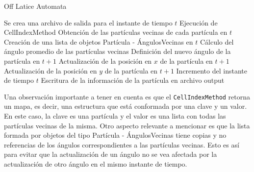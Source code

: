 \documentclass[11pt]{article}
\begin{document}
            \begin{algorithm}
                \caption{Off Latice Automata}
                \begin{algorithmic}[1]
                    \State Se crea una archivo de salida para el instante de tiempo $t$
                            \State Ejecución de CellIndexMethod
                            \State Obtención de las partículas vecinas de cada partícula en $t$
                            \State Creación de una lista de objetos Partícula - ÁngulosVecinas en $t$
                                \State Cálculo del ángulo promedio de las partículas vecinas
                                \State Definición del nuevo ángulo de la partícula en $t+1$
                                \State Actualización de la posición en $x$ de la partícula en $t+1$
                                \State Actualización de la posición en $y$ de la partícula en $t+1$
                                \State Incremento del instante de tiempo $t$
                                \State Escritura de la información de la partícula en archivo output
                            \EndWhile
                        \EndWhile
                \end{algorithmic}
            \end{algorithm}

            Una observación importante a tener en cuenta es que el \texttt{CellIndexMethod} retorna un mapa, es decir, una estructura
            que está conformada por una clave y un valor. En este caso, la clave es una partícula y el valor es una lista con todas
            las partículas vecinas de la misma.
            Otro aspecto relevante a mencionar es que la lista formada por objetos del tipo Partícula - ÁngulosVecinas
            tiene copias y no referencias de los ángulos correspondientes a las partículas vecinas. Esto es así para evitar que la actualización de un
            ángulo no se vea afectada por la actualización de otro ángulo en el mismo instante de tiempo.

    \newpage
\end{document}
